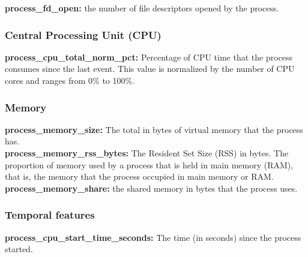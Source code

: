 \documentclass{iosart2c}
\begin{document}
\textbf{process\_fd\_open:} the number of file descriptors opened by the process.\\


\subsubsection{Central Processing Unit (CPU)}

\textbf{process\_cpu\_total\_norm\_pct:} Percentage of CPU time that the process consumes since the last event. This value is normalized by the number of CPU cores and ranges from 0\% to 100\%.\\

\subsubsection{Memory}

\textbf{process\_memory\_size:} The total in bytes of virtual memory that the process has.\\

\textbf{process\_memory\_rss\_bytes:} The Resident Set Size (RSS) in bytes. The proportion of memory used by a process that is held in main memory (RAM), that is, the memory that the process occupied in main memory or RAM.\\

\textbf{process\_memory\_share:} the shared memory in bytes that the process uses.\\

\subsubsection{Temporal features}

\textbf{process\_cpu\_start\_time\_seconds:} The time (in seconds) since the process started.\\







%
%

%
\end{document}
